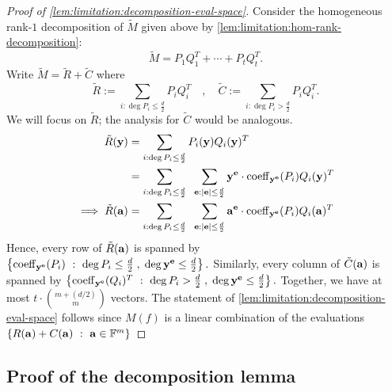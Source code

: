 \begin{proof}[Proof of \autoref{lem:limitation:decomposition-eval-space}]
  Consider the homogeneous rank-$1$ decomposition of $\tilde{M}$ given above by \autoref{lem:limitation:hom-rank-decomposition}:
  \[
    \tilde{M} = P_1 Q_1^T + \cdots + P_t Q_t^T.
  \]
  Write $\tilde{M} = \tilde{R} + \tilde{C}$ where
  \[
\tilde{R} := \sum_{i: \deg P_i \leq \frac{d}{2}} P_i Q_i^T\quad,\quad \tilde{C} := \sum_{i: \deg P_i > \frac{d}{2}} P_i Q_i^T.
  \]
  We will focus on $\tilde{R}$; the analysis for $\tilde{C}$ would be analogous.
  \begin{align*}
    \tilde{R}(\mathbf{y}) & = \sum_{i: \deg P_i \leq \frac{d}{2}} P_i(\mathbf{y})  Q_i(\mathbf{y})^T\\
             & = \sum_{i: \deg P_i \leq \frac{d}{2}}\;\; \sum_{\mathbf{e}: \left|\mathbf{e}\right| \leq \frac{d}{2}} \mathbf{y}^{\mathbf{e}} \cdot \operatorname{coeff}_{\mathbf{y}^{\mathbf{e}}}(P_i)  Q_i (\mathbf{y})^T\\
    \implies \tilde{R}(\mathbf{a}) & = \sum_{i: \deg P_i \leq \frac{d}{2}}\;\; \sum_{\mathbf{e}: \left|\mathbf{e}\right| \leq \frac{d}{2}} \mathbf{a}^{\mathbf{e}} \cdot \operatorname{coeff}_{\mathbf{y}^{\mathbf{e}}}(P_i)  Q_i (\mathbf{a})^T
  \end{align*}
  Hence, every row of $\tilde{R}(\mathbf{a})$ is spanned by $\left\{{\operatorname{coeff}_{\mathbf{y}^{\mathbf{e}}}(P_i)}\ : \ {\deg P_i \leq \frac{d}{2}\;,\; \deg \mathbf{y}^{\mathbf{e}} \leq \frac{d}{2}}\right\}.$  Similarly, every column of $\tilde{C}(\mathbf{a})$ is spanned by $\left\{{\operatorname{coeff}_{\mathbf{y}^{\mathbf{e}}}(Q_i)^T}\ : \ {\deg P_i > \frac{d}{2}\;,\; \deg \mathbf{y}^{\mathbf{e}} \leq \frac{d}{2}}\right\}.$ Together, we have at most $t \cdot \binom{m + (d/2)}{m}$ vectors. 
The statement of \autoref{lem:limitation:decomposition-eval-space} follows since $M(f)$ is a linear combination of the evaluations $\left\{{R(\mathbf{a})+C(\mathbf{a})}\ : \ {\mathbf{a}\in \mathbb{F}^m}\right\}$   
\end{proof}

\subsection*{Proof of the decomposition lemma}

